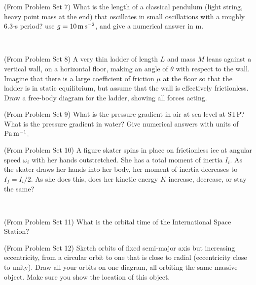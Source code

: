 \documentclass[12pt, letterpaper]{article}
\begin{document}
\vfill

\begin{problem} (From Problem Set 7)
  What is the length of a classical pendulum (light string, heavy point
  mass at the end) that oscillates in small oscillations with a roughly
  6.3-s period? use $g=10\,\mathrm{m}\,\mathrm{s}^{-2}$, and give a numerical answer in m.
\end{problem}

\vfill
~\clearpage

\begin{problem} (From Problem Set 8)
  A very thin ladder of length $L$ and mass $M$ leans against a vertical
  wall, on a horizontal floor, making an angle of $\theta$ with respect
  to the wall.  Imagine that there is a large coefficient of friction
  $\mu$ at the floor so that the ladder is in static
  equilibrium, but assume that the wall is effectively frictionless.
  Draw a free-body diagram for the ladder, showing all
  forces acting.
\end{problem}

\vfill

\begin{problem} (From Problem Set 9)
  What is the pressure gradient in air at sea level at STP?
  What is the pressure gradient in water?
  Give numerical answers with units of $\mathrm{Pa}\,\mathrm{m}^{-1}$.
\end{problem}

\vfill

\begin{problem} (From Problem Set 10)
  A figure skater spins in place on frictionless ice at
  angular speed $\omega_i$ with her hands outstretched.  She has a total
  moment of inertia $I_i$.  As the skater draws her hands into her body,
  her moment of inertia decreases to $I_f=I_i/2$. As she does this, does her kinetic
  energy $K$ increase, decrease, or stay the same?
\end{problem}

\vfill
~\clearpage

\begin{problem} (From Problem Set 11)
  What is the orbital time of the International Space Station?
\end{problem}

\vfill

\begin{problem} (From Problem Set 12)
  Sketch orbits of fixed semi-major axis but increasing
  eccentricity, from a circular orbit to one that is close to radial
  (eccentricity close to unity). Draw all your orbits on one diagram, all orbiting the same
  massive object. Make sure you show the location of this object.
\end{problem}
\end{document}
